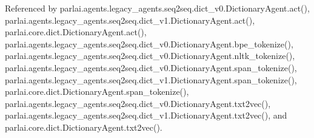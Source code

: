 Referenced by parlai.\+agents.\+legacy\+\_\+agents.\+seq2seq.\+dict\+\_\+v0.\+Dictionary\+Agent.\+act(), parlai.\+agents.\+legacy\+\_\+agents.\+seq2seq.\+dict\+\_\+v1.\+Dictionary\+Agent.\+act(), parlai.\+core.\+dict.\+Dictionary\+Agent.\+act(), parlai.\+agents.\+legacy\+\_\+agents.\+seq2seq.\+dict\+\_\+v0.\+Dictionary\+Agent.\+bpe\+\_\+tokenize(), parlai.\+agents.\+legacy\+\_\+agents.\+seq2seq.\+dict\+\_\+v0.\+Dictionary\+Agent.\+nltk\+\_\+tokenize(), parlai.\+agents.\+legacy\+\_\+agents.\+seq2seq.\+dict\+\_\+v0.\+Dictionary\+Agent.\+span\+\_\+tokenize(), parlai.\+agents.\+legacy\+\_\+agents.\+seq2seq.\+dict\+\_\+v1.\+Dictionary\+Agent.\+span\+\_\+tokenize(), parlai.\+core.\+dict.\+Dictionary\+Agent.\+span\+\_\+tokenize(), parlai.\+agents.\+legacy\+\_\+agents.\+seq2seq.\+dict\+\_\+v0.\+Dictionary\+Agent.\+txt2vec(), parlai.\+agents.\+legacy\+\_\+agents.\+seq2seq.\+dict\+\_\+v1.\+Dictionary\+Agent.\+txt2vec(), and parlai.\+core.\+dict.\+Dictionary\+Agent.\+txt2vec().

